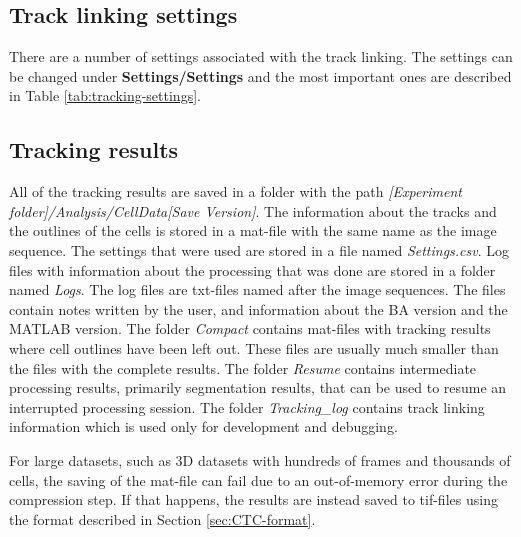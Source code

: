 \documentclass[a4paper, oneside, onecolumn, 11pt]{article}
\newcommand{\menu}[1]{\textbf{#1}}
\newcommand{\file}[1]{\emph{#1}}
\begin{document}
\subsection{Track linking settings}
There are a number of settings associated with the track linking. The settings can be changed under \menu{Settings/\allowbreak Settings} and the most important ones are described in Table \ref{tab:tracking-settings}.


\subsection{Tracking results}
\label{sec:tracking-results}
All of the tracking results are saved in a folder with the path \file{[Experiment folder]/\allowbreak Analysis/\allowbreak CellData[Save Version]}. The information about the tracks and the outlines of the cells is stored in a mat-file with the same name as the image sequence. The settings that were used are stored in a file named \file{Settings.csv}. Log files with information about the processing that was done are stored in a folder named \file{Logs}. The log files are txt-files named after the image sequences. The files contain notes written by the user, and information about the BA version and the MATLAB version. The folder \file{Compact} contains mat-files with tracking results where cell outlines have been left out. These files are usually much smaller than the files with the complete results. The folder \file{Resume} contains intermediate processing results, primarily segmentation results, that can be used to resume an interrupted processing session. The folder \file{Tracking\_log} contains track linking information which is used only for development and debugging.

For large datasets, such as 3D datasets with hundreds of frames and thousands of cells, the saving of the mat-file can fail due to an out-of-memory error during the compression step. If that happens, the results are instead saved to tif-files using the format described in Section \ref{sec:CTC-format}.
\end{document}

